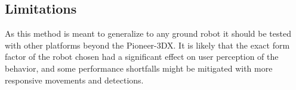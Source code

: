 \documentclass[letterpaper, 10 pt, conference]{ieeeconf}  %
\begin{document}












\subsection{Limitations}

As this method is meant to generalize to any ground robot it should be tested with other platforms beyond the Pioneer-3DX. It is likely that the exact form factor of the robot chosen had a significant effect on user perception of the behavior, and some performance shortfalls might be mitigated with more responsive movements and detections. 
\end{document}
